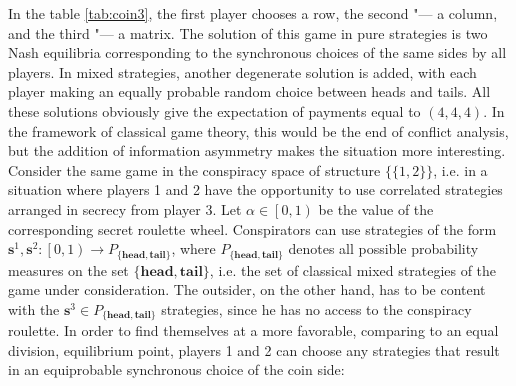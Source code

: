 In the table \ref{tab:coin3}, the first player chooses a row, the second "--- a column, and the third "--- a matrix. The solution of this game in pure strategies is two Nash equilibria corresponding to the synchronous choices of the same sides by all players. In mixed strategies, another degenerate solution is added, with each player making an equally probable random choice between heads and tails. All these solutions obviously give the expectation of payments equal to $(4,4,4)$. In the framework of classical game theory, this would be the end of conflict analysis, but the addition of information asymmetry makes the situation more interesting. Consider the same game in the conspiracy space of structure $\{\{1,2\}\}$, i.e. in a situation where players 1 and 2 have the opportunity to use correlated strategies arranged in secrecy from player 3. Let $\alpha \in \left[0, 1\right)$ be the value of the corresponding secret roulette wheel. Conspirators can use strategies of the form $\mathbf{s}^1, \mathbf{s}^2 : \left[ 0, 1\right) \rightarrow P_{\{\mathbf{head}, \mathbf{tail}\}}$, where $P_{\{\mathbf{head}, \mathbf{tail}\}}$ denotes all possible probability measures on the set $\{\mathbf{head}, \mathbf{tail}\}$, i.e. the set of classical mixed strategies of the game under consideration. The outsider, on the other hand, has to be content with the $\mathbf{s}^3 \in P_{\{\mathbf{head}, \mathbf{tail}\}}$ strategies, since he has no access to the conspiracy roulette. In order to find themselves at a more favorable, comparing to an equal division, equilibrium point, players 1 and 2 can choose any strategies that result in an equiprobable synchronous choice of the coin side: %
